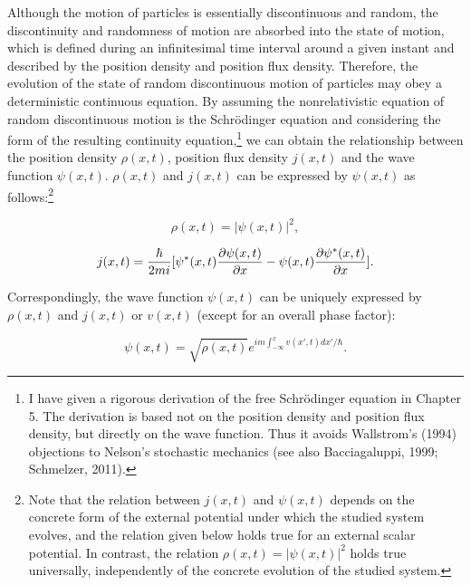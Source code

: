 Although the motion of particles is essentially discontinuous and random, the discontinuity and randomness of motion are absorbed into the state of motion, which is defined during an infinitesimal time interval around a given instant and described by the position density and position flux density. Therefore, the evolution of the state of random discontinuous motion of particles may obey a deterministic continuous equation. 
By assuming the nonrelativistic equation of random discontinuous motion is the Schr\"{o}dinger equation and considering the form of the resulting continuity equation,\footnote{I have given a rigorous derivation of the free Schr\"{o}dinger equation in Chapter 5. The derivation is based not on the position density and position flux density, but directly on the wave function. Thus it avoids Wallstrom's (1994) objections to Nelson's stochastic mechanics (see also Bacciagaluppi, 1999; Schmelzer, 2011).} we can obtain the relationship between the position density $\rho(x,t)$, position flux density $j(x,t)$ and the wave function $\psi(x,t)$. $\rho(x,t)$ and $j(x,t)$ can be expressed by $\psi(x,t)$ as follows:\footnote{Note that the relation between $j(x,t)$ and $\psi(x,t)$ depends on the concrete form of the external potential under which the studied system evolves, and the relation given below holds true for an external scalar potential. In contrast, the relation $\rho(x,t)=|\psi(x,t)|^2$ holds true universally, independently of the concrete evolution of the studied system. }

\begin{equation}
\rho(x,t)=|\psi(x,t)|^2,
\label{}
\end{equation}

\begin{equation}
j(x,t)={\hbar \over{2mi}}[\psi^*(x,t){{\partial \psi(x,t)}\over{\partial x}}-\psi(x,t){{\partial \psi^*(x,t)}\over{\partial x}}].
\label{}
\end{equation}

\noindent Correspondingly, the wave function $\psi(x,t)$ can be uniquely expressed by $\rho(x,t)$ and $j(x,t)$ or $v(x,t)$ (except for an overall phase factor): 

\begin{equation}
\psi(x,t)=\sqrt{\rho(x,t)}e^{im\int_{-\infty}^{x}{v(x',t)}dx'/\hbar}.
\label{}
\end{equation}


